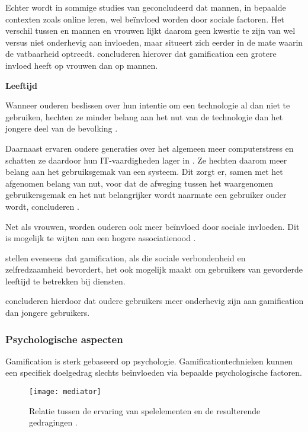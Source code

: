 Echter wordt in sommige studies van \textcite{Wang2008} geconcludeerd dat mannen, in bepaalde contexten zoals online leren, wel beïnvloed worden door sociale factoren. Het verschil tussen en mannen en vrouwen lijkt daarom geen kwestie te zijn van wel versus niet onderhevig aan invloeden, maar situeert zich eerder in de mate waarin de vatbaarheid optreedt. \textcite{PoloPena2020} concluderen hierover dat gamification een grotere invloed heeft op vrouwen dan op mannen.

\textbf{Leeftijd}

Wanneer ouderen beslissen over hun intentie om een technologie al dan niet te gebruiken, hechten ze minder belang aan het nut van de technologie dan het jongere deel van de bevolking \autocite{Venkatesh2003}.

Daarnaast ervaren oudere generaties over het algemeen meer computerstress en schatten ze daardoor hun IT-vaardigheden lager in \autocite{Chung2010}. Ze hechten daarom meer belang aan het gebruiksgemak van een systeem. Dit zorgt er, samen met het afgenomen belang van nut, voor dat de afweging tussen het waargenomen gebruikersgemak en het nut belangrijker wordt naarmate een gebruiker ouder wordt, concluderen \textcite{Melenhorst2001}.

Net als vrouwen, worden ouderen ook meer beïnvloed door sociale invloeden. Dit is mogelijk te wijten aan een hogere associatienood \autocite{Morris2000, Venkatesh2000, Wang2008}.

\textcite{Arning2007, Czaja2006} stellen eveneens dat gamification, als die sociale verbondenheid en zelfredzaamheid bevordert, het ook mogelijk maakt om gebruikers van gevorderde leeftijd te betrekken bij diensten.

\textcite{PoloPena2020} concluderen hierdoor dat oudere gebruikers meer onderhevig zijn aan gamification dan jongere gebruikers.

\subsubsection{Psychologische aspecten}
Gamification is sterk gebaseerd op psychologie.
Gamificationtechnieken kunnen een specifiek doelgedrag slechts beïnvloeden via bepaalde psychologische factoren.


\begin{figure}[h]
    \caption[Relatie tussen de ervaring van spelelementen en de resulterende gedragingen]{Relatie tussen de ervaring van spelelementen en de resulterende gedragingen \autocite{Kam2018}.}
    \texttt{[image: mediator]}
    \label{fig:mediator}
\end{figure}

